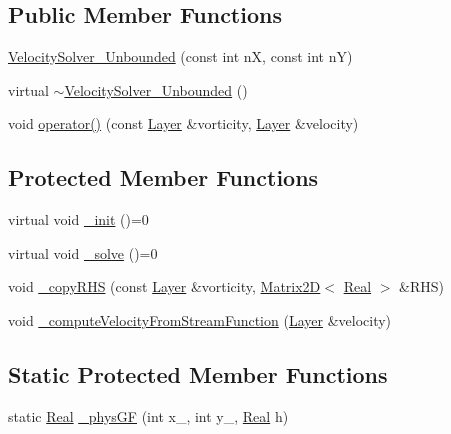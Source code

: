 \subsection*{Public Member Functions}
\begin{DoxyCompactItemize}
\item 
\hyperlink{class_velocity_solver___unbounded_a2a4f55337c05bd3e5a98d732d4524031}{Velocity\+Solver\+\_\+\+Unbounded} (const int n\+X, const int n\+Y)
\item 
virtual \hyperlink{class_velocity_solver___unbounded_ad2dda95d5b3e7cb435fc7223db486f44}{$\sim$\+Velocity\+Solver\+\_\+\+Unbounded} ()
\item 
void \hyperlink{class_velocity_solver___unbounded_a55beef939974ec2b79e869a403245534}{operator()} (const \hyperlink{struct_layer}{Layer} \&vorticity, \hyperlink{struct_layer}{Layer} \&velocity)
\end{DoxyCompactItemize}
\subsection*{Protected Member Functions}
\begin{DoxyCompactItemize}
\item 
virtual void \hyperlink{class_velocity_solver___unbounded_a5e5995e7ef4cb324f6fe4085084b19e6}{\+\_\+init} ()=0
\item 
virtual void \hyperlink{class_velocity_solver___unbounded_ad4a668aa6fcd70274bb71258f2c13b2d}{\+\_\+solve} ()=0
\item 
void \hyperlink{class_velocity_solver___unbounded_a09eef51ffa637ea0ae168a72b4ed13f2}{\+\_\+copy\+R\+H\+S} (const \hyperlink{struct_layer}{Layer} \&vorticity, \hyperlink{class_matrix2_d}{Matrix2\+D}$<$ \hyperlink{_h_d_f5_dumper_8h_a445a5f0e2a34c9d97d69a3c2d1957907}{Real} $>$ \&R\+H\+S)
\item 
void \hyperlink{class_velocity_solver___unbounded_a4e8deea623b04707623a2fa82ad151b7}{\+\_\+compute\+Velocity\+From\+Stream\+Function} (\hyperlink{struct_layer}{Layer} \&velocity)
\end{DoxyCompactItemize}
\subsection*{Static Protected Member Functions}
\begin{DoxyCompactItemize}
\item 
static \hyperlink{_h_d_f5_dumper_8h_a445a5f0e2a34c9d97d69a3c2d1957907}{Real} \hyperlink{class_velocity_solver___unbounded_a3d4f3335a5457ac8c5a8d80797048223}{\+\_\+phys\+G\+F} (int x\+\_\+, int y\+\_\+, \hyperlink{_h_d_f5_dumper_8h_a445a5f0e2a34c9d97d69a3c2d1957907}{Real} h)
\end{DoxyCompactItemize}
